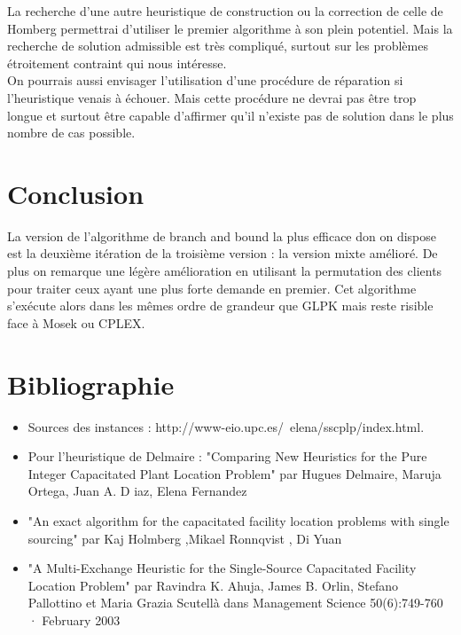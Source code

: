 \documentclass[12pt,a4paper]{article}
\begin{document}
La recherche d'une autre heuristique de construction ou la correction de celle de Homberg permettrai d'utiliser le premier algorithme à son plein potentiel. Mais la recherche de solution admissible est très compliqué, surtout sur les problèmes étroitement contraint qui nous intéresse.\\

On pourrais aussi envisager l'utilisation d'une procédure de réparation si l'heuristique venais à échouer. Mais cette procédure ne devrai pas être trop longue et surtout être capable d'affirmer qu'il n'existe pas de solution dans le plus nombre de cas possible.\\

\section*{Conclusion}

La version de l'algorithme de branch and bound la plus efficace don on dispose est la deuxième itération de la troisième version : la version mixte amélioré. De plus on remarque une légère amélioration en utilisant la permutation des clients pour traiter ceux ayant une plus forte demande en premier. Cet algorithme s’exécute alors dans les mêmes ordre de grandeur que GLPK mais reste risible face à Mosek ou CPLEX.\\
\section*{Bibliographie}

\begin{itemize}
\item
Sources des instances : http://www-eio.upc.es/~elena/sscplp/index.html.\\
\item
Pour l'heuristique de Delmaire : "Comparing New Heuristics for the Pure Integer Capacitated Plant Location Problem" par Hugues Delmaire, Maruja Ortega, Juan A. D iaz, Elena Fernandez 
\item
"An exact algorithm for the capacitated facility location problems with single sourcing" par Kaj Holmberg ,Mikael Ronnqvist , Di Yuan
\item
"A Multi-Exchange Heuristic for the Single-Source Capacitated Facility Location Problem" par Ravindra K. Ahuja, James B. Orlin, Stefano Pallottino et Maria Grazia Scutellà dans Management Science 50(6):749-760 · February 2003
\end{itemize}
\end{document}
